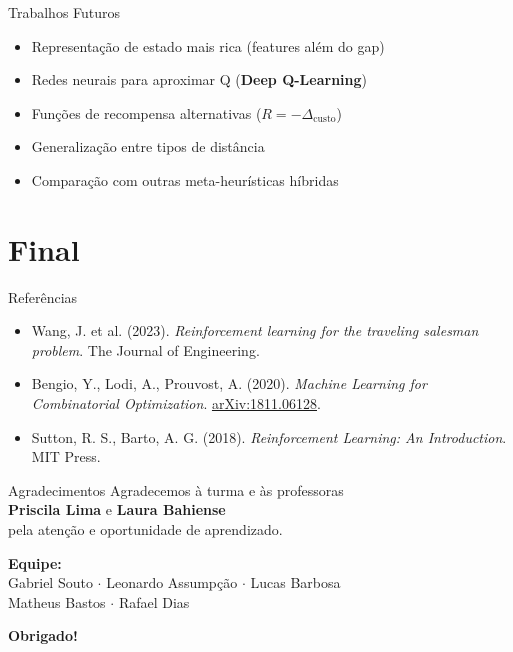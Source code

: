 \documentclass[11pt, xcolor=dvipsnames]{beamer}
\newcommand{\destaque}[1]{\textbf{\textcolor{verde}{#1}}}
\begin{document}
\begin{frame}{Trabalhos Futuros}
  \footnotesize
  \begin{itemize}
    \item Representação de estado mais rica (features além do gap)
    \item Redes neurais para aproximar Q (\destaque{Deep Q-Learning})
    \item Funções de recompensa alternativas ($R = -\Delta_{\text{custo}}$)
    \item Generalização entre tipos de distância
    \item Comparação com outras meta-heurísticas híbridas
  \end{itemize}
\end{frame}

\section*{Final}

\begin{frame}{Referências}
  \footnotesize
  \begin{itemize}
    \item Wang, J. et al. (2023).
          \textit{Reinforcement learning for the traveling salesman problem}.
          The Journal of Engineering.
    \item Bengio, Y., Lodi, A., Prouvost, A. (2020).
          \textit{Machine Learning for Combinatorial Optimization}.
          \href{https://arxiv.org/abs/1811.06128}{arXiv:1811.06128}.
    \item Sutton, R. S., Barto, A. G. (2018).
          \textit{Reinforcement Learning: An Introduction}. MIT Press.
  \end{itemize}
\end{frame}

\begin{frame}{Agradecimentos}
  \centering
  \vspace{1cm}
  Agradecemos à turma e às professoras \\ \destaque{Priscila Lima} e \destaque{Laura Bahiense} \\ pela atenção e oportunidade de aprendizado.

  \vspace{1.5cm}
  {\small
  \textbf{Equipe:} \\
  Gabriel Souto $\cdot$ Leonardo Assumpção $\cdot$ Lucas Barbosa \\
  Matheus Bastos $\cdot$ Rafael Dias
  }

  \vspace{1cm}
  {\Large \destaque{Obrigado!}}
\end{frame}
\end{document}
